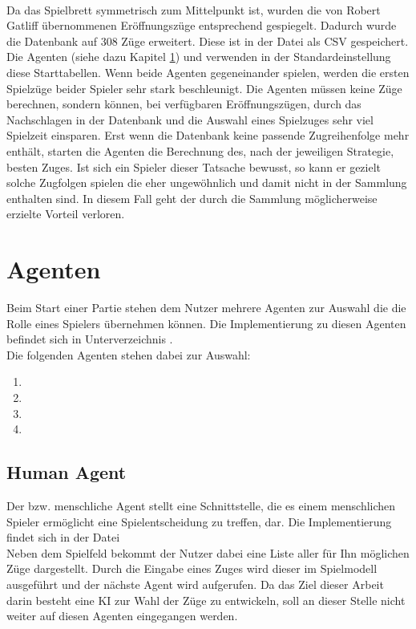 \\Da das Spielbrett symmetrisch zum Mittelpunkt ist, wurden die von Robert Gatliff \cite{open1} übernommenen Eröffnungszüge entsprechend gespiegelt. Dadurch wurde die Datenbank auf 308 Züge erweitert. Diese ist in der Datei  als CSV gespeichert.
\\Die Agenten (siehe dazu Kapitel \ref{agenten}) \mxZitat{\mc} und \mxZitat{\abp} verwenden in der Standardeinstellung diese Starttabellen. Wenn beide Agenten gegeneinander spielen, werden die ersten Spielzüge beider Spieler sehr stark beschleunigt. Die Agenten müssen keine Züge berechnen, sondern können, bei verfügbaren Eröffnungszügen, durch das Nachschlagen in der Datenbank und die Auswahl eines Spielzuges sehr viel Spielzeit einsparen. Erst wenn die Datenbank keine passende Zugreihenfolge mehr enthält, starten die Agenten die Berechnung des, nach der jeweiligen Strategie, besten Zuges. Ist sich ein Spieler dieser Tatsache bewusst, so kann er gezielt solche Zugfolgen spielen die eher ungewöhnlich und damit nicht in der Sammlung enthalten sind. In diesem Fall geht der durch die Sammlung möglicherweise erzielte Vorteil verloren.
\section{Agenten}
\label{agenten}
Beim Start einer Partie stehen dem Nutzer mehrere Agenten zur Auswahl die die Rolle eines Spielers übernehmen können. Die Implementierung zu diesen Agenten befindet sich in Unterverzeichnis .
\\Die folgenden Agenten stehen dabei zur Auswahl:
\begin{enumerate}
\item {}
\item {}
\item \mxZitat{\mc}
\item \mxZitat{\abp}
\end{enumerate}
\subsection{Human Agent}
Der  bzw. menschliche Agent stellt eine Schnittstelle, die es einem menschlichen Spieler ermöglicht eine Spielentscheidung zu treffen, dar. Die Implementierung findet sich in der Datei 
\\Neben dem Spielfeld bekommt der Nutzer dabei eine Liste aller für Ihn möglichen Züge dargestellt. Durch die Eingabe eines Zuges wird dieser im Spielmodell ausgeführt und der nächste Agent wird aufgerufen. Da das Ziel dieser Arbeit darin besteht eine \ac{KI} zur Wahl der Züge zu entwickeln, soll an dieser Stelle nicht weiter auf diesen Agenten eingegangen werden.

